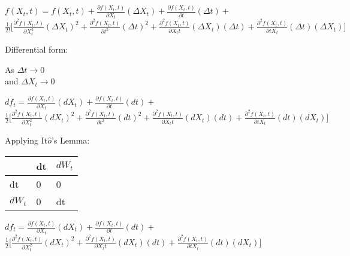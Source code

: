 \documentclass[12pt]{article}
\begin{document}
\hfill

\begin{center}

    

${f(X_t,t) = f(X_t,t) + \frac{\partial f(X_t,t)}{\partial X_t}(\Delta X_t) + \frac{\partial f(X_t,t)}{\partial t}(\Delta t) +}$\\
${\frac{1}{2!}\Big[\frac{\partial^2 f(X_t,t)}{\partial X_t^2}(\Delta X_t)^{2}+\frac{\partial^2 f(X_t,t)}{\partial t^2}(\Delta t)^{2}+\frac{\partial^2 f(X_t,t)}{\partial X_t t}(\Delta X_t)(\Delta t)+\frac{\partial^2 f(X_t,t)}{\partial t X_t}(\Delta t)(\Delta X_t)\Big]}$


\end{center}

Differential form:

As $\Delta t \rightarrow 0$\\
and $\Delta X_t \rightarrow 0$

\begin{center}

${df_t =  \frac{\partial f(X_t,t)}{\partial X_t}(dX_t) + \frac{\partial f(X_t,t)}{\partial t}(dt) +}$\\
${\frac{1}{2}\Big[\frac{\partial^2 f(X_t,t)}{\partial X_t^2}(dX_t)^{2}+\frac{\partial^2 f(X_t,t)}{\partial t^2}(dt)^{2}+\frac{\partial^2 f(X_t,t)}{\partial X_t t}(dX_t)(dt)+\frac{\partial^2 f(X_t,t)}{\partial t X_t}(dt)(dX_t)\Big]}$

\end{center}

\newpage

 Applying It$\hat{o}$'s Lemma:
\begin{table}[h]
\begin{tabular}{|l|l|l|}
\hline
      & dt & ${dW_t}$ \\ \hline
dt    & 0  & 0     \\ \hline
${dW_t}$ & 0  & dt    \\ \hline
\end{tabular}
\end{table}

\begin{center}

${df_t =  \frac{\partial f(X_t,t)}{\partial X_t}(dX_t) + \frac{\partial f(X_t,t)}{\partial t}(dt) +}$\\
${\frac{1}{2}\Big[\frac{\partial^2 f(X_t,t)}{\partial X_t^2}(dX_t)^2+\frac{\partial^2 f(X_t,t)}{\partial X_t t}(dX_t)(dt)+\frac{\partial^2 f(X_t,t)}{\partial t X_t}(dt)(dX_t)\Big]}$

\end{center}
\end{document}
